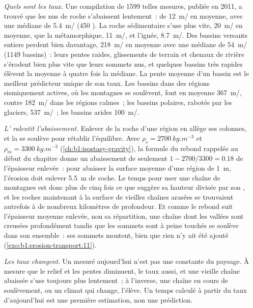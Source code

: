 \emph{Quels sont les taux.} Une compilation de \num{1599} telles mesures,
publiée en 2011, a trouvé que les  nus de roche s'abaissent lentement~: de
\qty{12}{m/\Ma} en moyenne, avec une médiane de \qty{5.4}{m/\Ma} (450 ).
La roche sédimentaire s'use plus vite, \qty{20}{m/\Ma} en moyenne, que la
métamorphique, \qty{11}{m/\Ma}, et l'ignée, \qty{8.7}{m/\Ma}. Des bassins versants
entiers perdent bien davantage, \qty{218}{m/\Ma} en moyenne avec une médiane de
\qty{54}{m/\Ma} (\num{1149} bassins)~: leurs pentes raides, glissements de terrain et
chenaux de rivière s'érodent bien plus vite que leurs sommets nus, et quelques bassins très rapides
élèvent la moyenne à quatre fois la médiane. La pente moyenne d'un bassin est le
meilleur prédicteur unique de son taux. Les bassins dans des régions sismiquement actives, où
les montagnes se soulèvent, font en moyenne \qty{367}{m/\Ma}, contre \qty{182}{m/\Ma} dans les
régions calmes~; les bassins polaires, rabotés par les glaciers, \qty{537}{m/\Ma}~; les bassins arides
\qty{100}{m/\Ma}.

\emph{L' ralentit l'abaissement.} Enlever de la roche d'une région en 
allège ses colonnes, et la  se soulève pour rétablir l'équilibre. Avec $\rho_c
= \qty{2700}{kg.m^{-3}}$ et $\rho_m = \qty{3300}{kg.m^{-3}}$
(\cref{ch:b1:isostasy-gravity}), la formule du rebond rappelée au début du
chapitre donne un abaissement de seulement $1 - 2700/3300 = 0.18$ de l'épaisseur
enlevée~: pour abaisser la surface moyenne d'une région de \qty{1}{m}, l'érosion doit
enlever \qty{5.5}{m} de roche. Le temps pour user une chaîne de montagnes est donc
plus de cinq fois ce que suggère sa hauteur divisée par son ,
et les roches maintenant à la surface de vieilles chaînes arasées se trouvaient autrefois à de nombreux
kilomètres de profondeur. Et comme le rebond suit l'épaisseur moyenne enlevée,
non sa répartition, une chaîne dont les vallées sont creusées profondément tandis que les sommets sont
à peine touchés se soulève dans son ensemble~: ses sommets montent, bien que rien n'y ait
été ajouté (\cref{exo:b1:erosion-transport:11}).

\emph{Les taux changent.} Un  mesuré aujourd'hui n'est pas une constante du
paysage. À mesure que le relief et les pentes diminuent, le taux aussi, et une
vieille chaîne abaissée s'use toujours plus lentement~; à l'inverse, une chaîne en cours de
soulèvement, ou un climat qui change, l'élève. Un temps calculé à partir du taux
d'aujourd'hui est une première estimation, non une prédiction.

